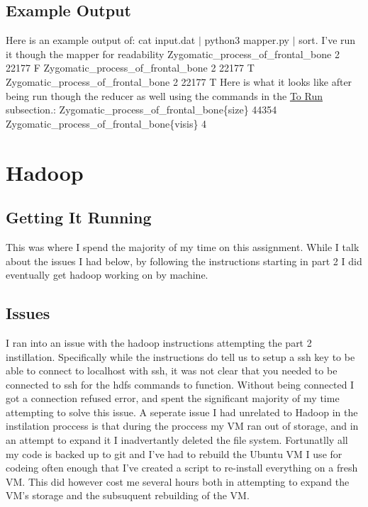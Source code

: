 \documentclass{article}
\begin{document}
\subsection{Example Output}
Here is an example output of: cat input.dat $|$ python3 mapper.py $|$ sort. I've run it though the mapper for readability
\newline
\newline
Zygomatic\_process\_of\_frontal\_bone    2    22177    F
\newline
Zygomatic\_process\_of\_frontal\_bone    2    22177    T
\newline
Zygomatic\_process\_of\_frontal\_bone    2    22177    T
\newline
\newline
Here is what it looks like after being run though the reducer as well using the commands in the \hyperref[subsec:run]{To Run} subsection.:
\newline
\newline
Zygomatic\_process\_of\_frontal\_bone\{size\}	44354
\newline
Zygomatic\_process\_of\_frontal\_bone\{visis\}	4

\section{Hadoop}
\subsection{Getting It Running}

This was where I spend the majority of my time on this assignment. While I talk about the issues I had below, by following the instructions starting in part 2 I did eventually get hadoop working on by machine.

\subsection{Issues}

I ran into an issue with the hadoop instructions attempting the part 2 instillation. Specifically while the instructions do tell us to setup a ssh key to be able to connect to localhost with ssh, it was not clear that you needed to be connected to ssh for the hdfs commands to function. Without being connected I got a connection refused error, and spent the significant majority of my time attempting to solve this issue.
\newline
\newline
A seperate issue I had unrelated to Hadoop in the instilation proccess is that during the proccess my VM ran out of storage, and in an attempt to expand it I inadvertantly deleted the file system. Fortunatlly all my code is backed up to git and I've had to rebuild the Ubuntu VM I use for codeing often enough that I've created a script to re-install everything on a fresh VM. This did however cost me several hours both in attempting to expand the VM's storage and the subsuquent rebuilding of the VM.
\end{document}
